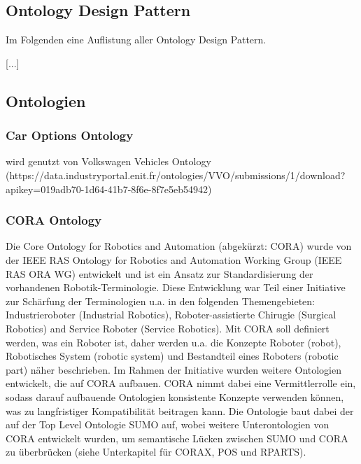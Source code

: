 \documentclass{article}
\begin{document}
\subsection{Ontology Design Pattern}

Im Folgenden eine Auflistung aller Ontology Design Pattern.

[...]

\subsection{Ontologien}


\subsubsection{Car Options Ontology}

wird genutzt von Volkswagen Vehicles Ontology (https://data.industryportal.enit.fr/ontologies/VVO/submissions/1/download?apikey=019adb70-1d64-41b7-8f6e-8f7e5eb54942)

\subsubsection{CORA Ontology}


Die Core Ontology for Robotics and Automation (abgekürzt: CORA) \cite{prestes2014core} wurde von der IEEE RAS Ontology for Robotics and Automation Working Group (IEEE RAS ORA WG) entwickelt und ist ein Ansatz zur Standardisierung der vorhandenen Robotik-Terminologie.
Diese Entwicklung war Teil einer Initiative zur Schärfung der Terminologien u.a. in den folgenden Themengebieten: Industrieroboter (Industrial Robotics), Roboter-assistierte Chirugie (Surgical Robotics) and Service Roboter (Service Robotics).
Mit CORA soll definiert werden, was ein Roboter ist, daher werden u.a. die Konzepte Roboter (robot), Robotisches System (robotic system) und Bestandteil eines Roboters (robotic part) näher beschrieben.
Im Rahmen der Initiative wurden weitere Ontologien entwickelt, die auf CORA aufbauen.
CORA nimmt dabei eine Vermittlerrolle ein, sodass darauf aufbauende Ontologien konsistente Konzepte verwenden können, was zu langfristiger Kompatibilität beitragen kann.
Die Ontologie baut dabei der auf der Top Level Ontologie SUMO auf, wobei weitere Unterontologien von CORA entwickelt wurden, um semantische Lücken zwischen SUMO und CORA zu überbrücken (siehe Unterkapitel für CORAX, POS und RPARTS).
\end{document}
